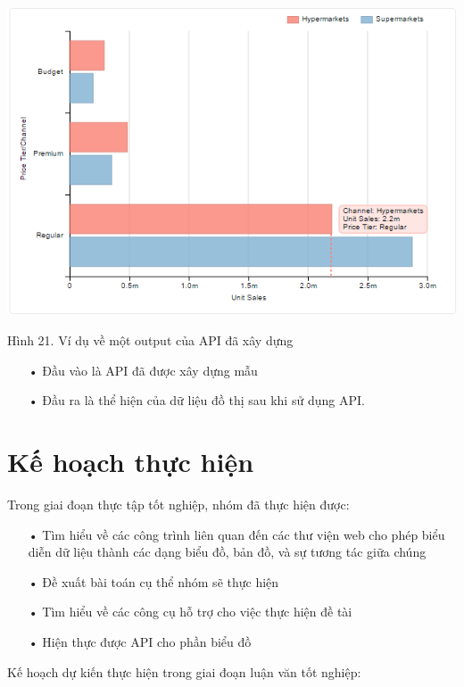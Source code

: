 \documentclass[12pt,a4paper]{article}
\begin{document}
	\begin{center}
    \includegraphics[scale=.8]{image/api_sample}
    
    Hình 21. Ví dụ về một output của API đã xây dựng
    \end{center}

\begin{itemize}

\item[•] Đầu vào là API đã được xây dựng mẫu

\item[•] Đầu ra là thể hiện của dữ liệu đồ thị sau khi sử dụng API.
\end{itemize}

\section{Kế hoạch thực hiện}
Trong giai đoạn thực tập tốt nghiệp, nhóm đã thực hiện được:

\begin{itemize}

\item[•]Tìm hiểu về các công trình liên quan đến các thư viện web cho phép biểu diễn dữ liệu thành các dạng biểu đồ, bản đồ, và sự tương tác giữa chúng

\item[•]Đề xuất bài toán cụ thể nhóm sẽ thực hiện

\item[•]Tìm hiểu về các công cụ hỗ trợ cho việc thực hiện đề tài

\item[•]Hiện thực được API cho phần biểu đồ

\end{itemize}
Kế hoạch dự kiến thực hiện trong giai đoạn luận văn tốt nghiệp:
\end{document}
